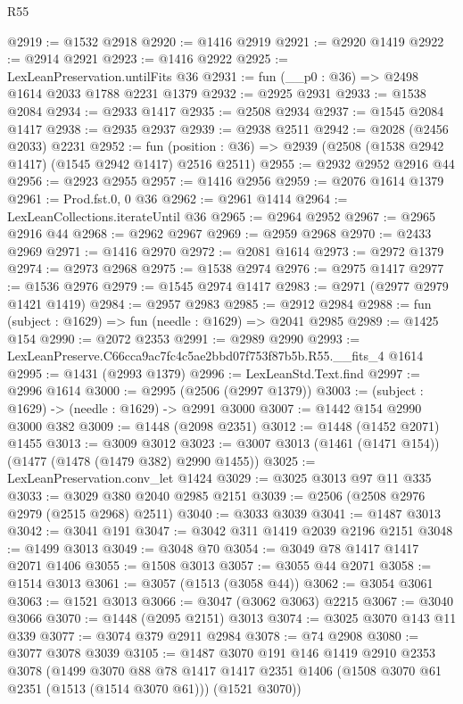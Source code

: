 \begin{lexlean}{R55}
\begin{coremodule}
{{@2919 := @1532 @2918
@2920 := @1416 @2919
@2921 := @2920 @1419
@2922 := @2914 @2921
@2923 := @1416 @2922
@2925 := LexLeanPreservation.untilFits @36
@2931 := fun (__p0 : @36) => @2498 @1614 @2033 @1788 @2231 @1379
@2932 := @2925 @2931
@2933 := @1538 @2084
@2934 := @2933 @1417
@2935 := @2508 @2934
@2937 := @1545 @2084 @1417
@2938 := @2935 @2937
@2939 := @2938 @2511
@2942 := @2028 (@2456 @2033) @2231
@2952 := fun (position : @36) => @2939 (@2508 (@1538 @2942 @1417) (@1545 @2942 @1417) @2516 @2511)
@2955 := @2932 @2952 @2916 @44
@2956 := @2923 @2955
@2957 := @1416 @2956
@2959 := @2076 @1614 @1379
@2961 := Prod.fst.{0, 0} @36
@2962 := @2961 @1414
@2964 := LexLeanCollections.iterateUntil @36
@2965 := @2964 @2952
@2967 := @2965 @2916 @44
@2968 := @2962 @2967
@2969 := @2959 @2968
@2970 := @2433 @2969
@2971 := @1416 @2970
@2972 := @2081 @1614
@2973 := @2972 @1379
@2974 := @2973 @2968
@2975 := @1538 @2974
@2976 := @2975 @1417
@2977 := @1536 @2976
@2979 := @1545 @2974 @1417
@2983 := @2971 (@2977 @2979 @1421 @1419)
@2984 := @2957 @2983
@2985 := @2912 @2984
@2988 := fun (subject : @1629) => fun (needle : @1629) => @2041 @2985
@2989 := @1425 @154
@2990 := @2072 @2353
@2991 := @2989 @2990
@2993 := LexLeanPreserve.C66cca9ac7fc4c5ae2bbd07f753f87b5b.R55.__fits_4 @1614
@2995 := @1431 (@2993 @1379)
@2996 := LexLeanStd.Text.find
@2997 := @2996 @1614
@3000 := @2995 (@2506 (@2997 @1379))
@3003 := (subject : @1629) -> (needle : @1629) -> @2991 @3000
@3007 := @1442 @154 @2990 @3000 @382
@3009 := @1448 (@2098 @2351)
@3012 := @1448 (@1452 @2071) @1455
@3013 := @3009 @3012
@3023 := @3007 @3013 (@1461 (@1471 @154)) (@1477 (@1478 (@1479 @382) @2990 @1455))
@3025 := LexLeanPreservation.conv_let @1424
@3029 := @3025 @3013 @97 @11 @335
@3033 := @3029 @380 @2040 @2985 @2151
@3039 := @2506 (@2508 @2976 @2979 (@2515 @2968) @2511)
@3040 := @3033 @3039
@3041 := @1487 @3013
@3042 := @3041 @191
@3047 := @3042 @311 @1419 @2039 @2196 @2151
@3048 := @1499 @3013
@3049 := @3048 @70
@3054 := @3049 @78 @1417 @1417 @2071 @1406
@3055 := @1508 @3013
@3057 := @3055 @44 @2071
@3058 := @1514 @3013
@3061 := @3057 (@1513 (@3058 @44))
@3062 := @3054 @3061
@3063 := @1521 @3013
@3066 := @3047 (@3062 @3063) @2215
@3067 := @3040 @3066
@3070 := @1448 (@2095 @2151) @3013
@3074 := @3025 @3070 @143 @11 @339
@3077 := @3074 @379 @2911 @2984
@3078 := @74 @2908
@3080 := @3077 @3078 @3039
@3105 := @1487
    @3070
    @191
    @146
    @1419
    @2910
    @2353
    @3078
    (@1499
      @3070
      @88
      @78
      @1417
      @1417
      @2351
      @1406
      (@1508 @3070 @61 @2351 (@1513 (@1514 @3070 @61)))
      (@1521 @3070))
}}
\end{coremodule}
\end{lexlean}
